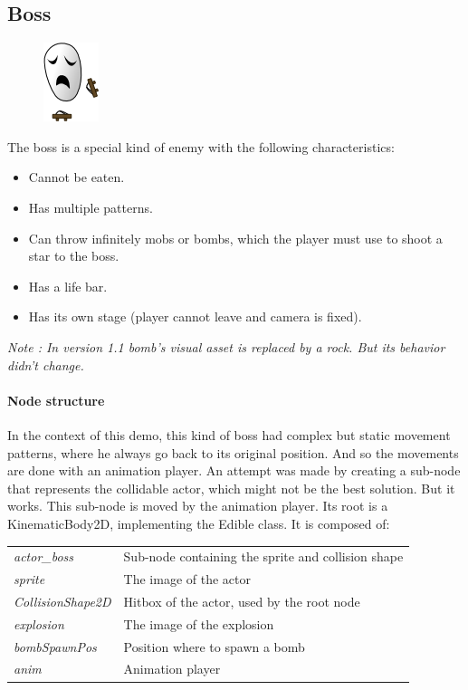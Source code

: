 \documentclass[10pt,a4paper]{article}
\begin{document}
\subsection{Boss}
\begin{figure}
\includegraphics[bb=0 0 54 75,scale=0.5]{boss.png} 
\end{figure}
The boss is a special kind of enemy with the following characteristics:
\begin{itemize}
\item Cannot be eaten.
\item Has multiple patterns.
\item Can throw infinitely mobs or bombs, which the player must use to shoot a star to the boss.
\item Has a life bar.
\item Has its own stage (player cannot leave and camera is fixed).
\end{itemize}

\textit{Note : In version 1.1 bomb's visual asset is replaced by a rock. But its behavior didn't change.}

\paragraph{Node structure}
In the context of this demo, this kind of boss had complex but static movement patterns, where he always go back to its original position. And so the movements are done with an animation player. An attempt was made by creating a sub-node that represents the collidable actor, which might not be the best solution. But it works. This sub-node is moved by the animation player.
Its root is a KinematicBody2D, implementing the Edible class.
It is composed of: \\
\begin{tabular}{ l  l }
  \textit{actor\_boss} & Sub-node containing the sprite and collision shape \\
  \textit{sprite} & The image of the actor \\
  \textit{CollisionShape2D} & Hitbox of the actor, used by the root node \\
  \textit{explosion} & The image of the explosion \\
  \textit{bombSpawnPos} & Position where to spawn a bomb \\
  \textit{anim} & Animation player \\
\end{tabular}
\end{document}
